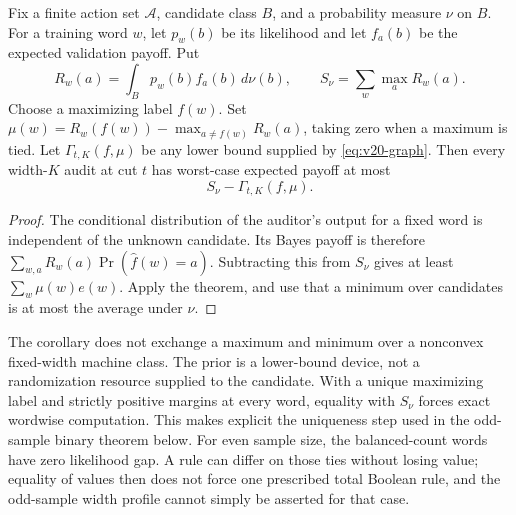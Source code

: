 \begin{corollary}
\label{cor:v20-bayes}
Fix a finite action set $\mathcal A$, candidate class $B$, and a
probability measure $\nu$ on $B$. For a training word $w$, let $p_w(b)$
be its likelihood and let $f_a(b)$ be the expected validation payoff.
Put
\[
 R_w(a)=\int_Bp_w(b)f_a(b)\,d\nu(b),\qquad
 S_\nu=\sum_w\max_a R_w(a).
\]
Choose a maximizing label $f(w)$. Set
$\mu(w)=R_w(f(w))-\max_{a\ne f(w)}R_w(a)$, taking zero when a maximum
is tied. Let $\Gamma_{t,K}(f,\mu)$ be any lower bound supplied by
\eqref{eq:v20-graph}. Then every width-$K$ audit at cut $t$ has
worst-case expected payoff at most
\begin{equation}\label{eq:v20-bayes}
 S_\nu-\Gamma_{t,K}(f,\mu).
\end{equation}
\end{corollary}
\begin{proof}
The conditional distribution of the auditor's output for a fixed word
is independent of the unknown candidate. Its Bayes payoff is therefore
$\sum_{w,a}R_w(a)\Pr(\widehat f(w)=a)$. Subtracting this from $S_\nu$
gives at least $\sum_w\mu(w)e(w)$. Apply the theorem, and use that a
minimum over candidates is at most the average under $\nu$.
\end{proof}

The corollary does not exchange a maximum and minimum over a nonconvex
fixed-width machine class. The prior is a lower-bound device, not a
randomization resource supplied to the candidate. With a unique maximizing
label and strictly positive margins at every word, equality with $S_\nu$
forces exact wordwise computation. This makes explicit the uniqueness
step used in the odd-sample binary theorem below. For even sample size,
the balanced-count words have zero likelihood gap. A rule can differ on
those ties without losing value; equality of values then does not force
one prescribed total Boolean rule, and the odd-sample width profile cannot
simply be asserted for that case.

